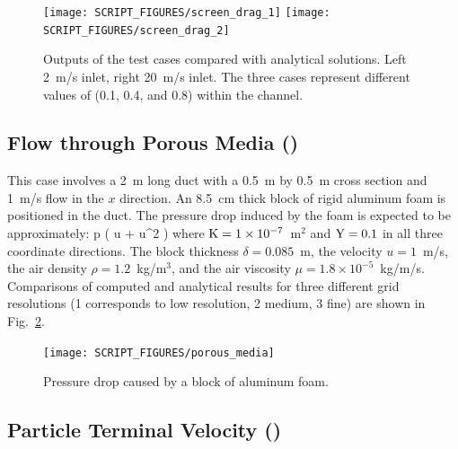 \documentclass[11pt]{book}
\begin{document}
\begin{figure}[ht]
\texttt{[image: SCRIPT\_FIGURES/screen\_drag\_1]}
\texttt{[image: SCRIPT\_FIGURES/screen\_drag\_2]}
\caption[Sample cases ]{Outputs of the  test cases compared with analytical solutions.  Left 2~m/s inlet, right 20~m/s inlet.  The three cases represent different values of  (0.1, 0.4, and 0.8) within the channel.}
\label{screen_drag_plots}
\end{figure}

\subsection{Flow through Porous Media (\texorpdfstring{}{porous\_media})}
\label{porous_media}

This case involves a 2~m long duct with a 0.5~m by 0.5~m cross section and 1~m/s flow in the $x$ direction. An 8.5~cm thick block of rigid aluminum foam is positioned in the duct. The pressure drop induced by the foam is expected to be approximately:
\be
   \Delta p \approx \delta \left(  u \; + \; \rho {} u^2 \right)
\ee
where ${\rm K}=1 \times 10^{-7}$~m$^2$ and ${\rm Y}=0.1$ in all three coordinate directions. The block thickness $\delta=0.085$~m, the velocity $u=1$~m/s, the air density $\rho=1.2$~kg/m$^3$, and the air viscosity $\mu=1.8 \times 10^{-5}$~kg/m/s. Comparisons of computed and analytical results for three different grid resolutions (1 corresponds to low resolution, 2 medium, 3 fine) are shown in Fig.~\ref{porous_media_plot}.

\begin{figure}[ht]
\centering
\texttt{[image: SCRIPT\_FIGURES/porous\_media]}
\caption[Results of the  test case]{Pressure drop caused by a block of aluminum foam.}
\label{porous_media_plot}
\end{figure}




\subsection{Particle Terminal Velocity (\texorpdfstring{}{terminal\_velocity})}
\end{document}
